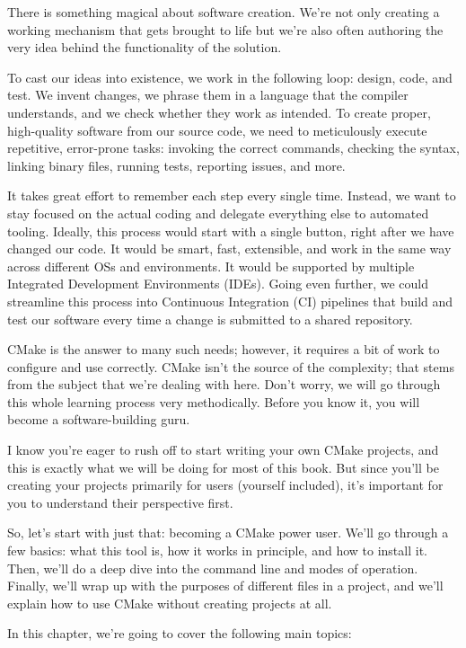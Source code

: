 There is something magical about software creation. We’re not only creating a working mechanism that gets brought to life but we’re also often authoring the very idea behind the functionality of the solution.

To cast our ideas into existence, we work in the following loop: design, code, and test. We invent changes, we phrase them in a language that the compiler understands, and we check whether they work as intended. To create proper, high-quality software from our source code, we need to meticulously execute repetitive, error-prone tasks: invoking the correct commands, checking the syntax, linking binary files, running tests, reporting issues, and more.

It takes great effort to remember each step every single time. Instead, we want to stay focused on the actual coding and delegate everything else to automated tooling. Ideally, this process would start with a single button, right after we have changed our code. It would be smart, fast, extensible, and work in the same way across different OSs and environments. It would be supported by multiple Integrated Development Environments (IDEs). Going even further, we could streamline this process into Continuous Integration (CI) pipelines that build and test our software every time a change is submitted to a shared repository.

CMake is the answer to many such needs; however, it requires a bit of work to configure and use correctly. CMake isn’t the source of the complexity; that stems from the subject that we’re dealing with here. Don’t worry, we will go through this whole learning process very methodically. Before you know it, you will become a software-building guru.

I know you’re eager to rush off to start writing your own CMake projects, and this is exactly what we will be doing for most of this book. But since you’ll be creating your projects primarily for users (yourself included), it’s important for you to understand their perspective first.

So, let’s start with just that: becoming a CMake power user. We’ll go through a few basics: what this tool is, how it works in principle, and how to install it. Then, we’ll do a deep dive into the command line and modes of operation. Finally, we’ll wrap up with the purposes of different files in a project, and we’ll explain how to use CMake without creating projects at all.

In this chapter, we’re going to cover the following main topics:

